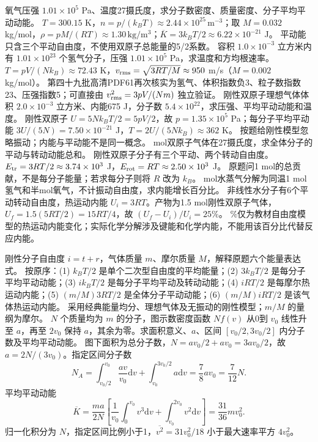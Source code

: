 \problemtext 氧气压强 $1.01\times10^5$ Pa、温度27摄氏度，求分子数密度、质量密度、分子平均平动动能。
\workings $T=300.15$ K，$n=p/(k_BT)\approx2.44\times10^{25}\,\mathrm{m^{-3}}$；取 $M=0.032$ kg/mol，$\rho=pM/(RT)\approx1.30\,\mathrm{kg/m^3}$；$\overline K=3k_BT/2\approx6.22\times10^{-21}$ J。
\crosscheck 平动能只含三个平动自由度，不使用双原子总能量的5/2系数。
\problemtext 容积 $1.0\times10^{-3}$ 立方米内有 $1.01\times10^{23}$ 个氢气分子，压强 $1.01\times10^5$ Pa，求温度和方均根速率。
\workings $T=pV/(Nk_B)\approx72.43$ K，$v_{\rm rms}=\sqrt{3RT/M}\approx950$ m/s（$M=0.002$ kg/mol）。
\crosscheck 第四十九批高清PDF61再次核实为氢气、体积指数负3、粒子数指数23、压强指数5；可直接由 $v_{\rm rms}^2=3pV/(Nm)$ 独立验证。
\problemtext 刚性双原子理想气体体积 $2.0\times10^{-3}$ 立方米、内能675 J，分子数 $5.4\times10^{22}$，求压强、平均平动动能和温度。
\workings 刚性双原子 $U=5Nk_BT/2=5pV/2$，故 $p=1.35\times10^5$ Pa；每分子平均平动能 $3U/(5N)=7.50\times10^{-21}$ J，$T=2U/(5Nk_B)\approx362$ K。
\crosscheck 按题给刚性模型忽略振动；内能与平动能不是同一概念。
 mol双原子气体在27摄氏度，求全体分子的平动与转动动能总和。
\workings 刚性双原子分子有三个平动、两个转动自由度。$E_{\rm tr}=3RT/2\approx3.74\times10^3$ J，$E_{\rm rot}=RT\approx2.50\times10^3$ J。
\crosscheck 原题问1 mol的总贡献，不是每分子能量；若求每分子则将 $R$ 改为 $k_B$。
 mol水蒸气分解为同温1 mol氢气和半mol氧气，不计振动自由度，求内能增长百分比。
\workings 非线性水分子有6个平动转动自由度，热运动内能 $U_i=3RT$。产物为1.5 mol刚性双原子气体，$U_f=1.5(5RT/2)=15RT/4$，故 $(U_f-U_i)/U_i=25\%$。
\%仅为教材自由度模型的热运动内能变化；实际化学分解涉及键能和化学内能，不能用该百分比代替反应内能。

\problemtext 刚性分子自由度 $i=t+r$，气体质量 $m$、摩尔质量 $M$，解释原题六个能量表达式。
\workings 按原序：(1) $k_BT/2$ 是单个二次型自由度的平均能量；(2) $3k_BT/2$ 是每分子平均平动动能；(3) $ik_BT/2$ 是每分子平均平动及转动动能；(4) $iRT/2$ 是每摩尔热运动内能；(5) $(m/M)3RT/2$ 是全体分子平动动能；(6) $(m/M)iRT/2$ 是该气体热运动内能。
\crosscheck 采用经典能量均分、理想气体及无振动的刚性模型；$m/M$ 的量纲为摩尔。
\problemtext $N$ 个质量均为 $m$ 的分子，图示数密度函数 $Nf(v)$ 从0到 $v_0$ 线性升至 $a$，再至 $2v_0$ 保持 $a$，其余为零。求面积意义、$a$、区间 $[v_0/2,3v_0/2]$ 内分子数及平均平动动能。
\workings 图下面积为总分子数，$N=av_0/2+av_0=3av_0/2$，故 $a=2N/(3v_0)$。指定区间分子数
\[
N_A=\int_{v_0/2}^{v_0}\frac{av}{v_0}\mathrm dv+\int_{v_0}^{3v_0/2}a\mathrm dv
=\frac78av_0=\frac7{12}N.
\]
平均平动动能
\[
\overline K=\frac{ma}{2N}\left[\frac1{v_0}\int_0^{v_0}v^3\mathrm dv+\int_{v_0}^{2v_0}v^2\mathrm dv\right]
=\frac{31}{36}mv_0^2.
\]
\crosscheck 归一化积分为 $N$，指定区间比例小于1，$\overline{v^2}=31v_0^2/18$ 小于最大速率平方 $4v_0^2$。
